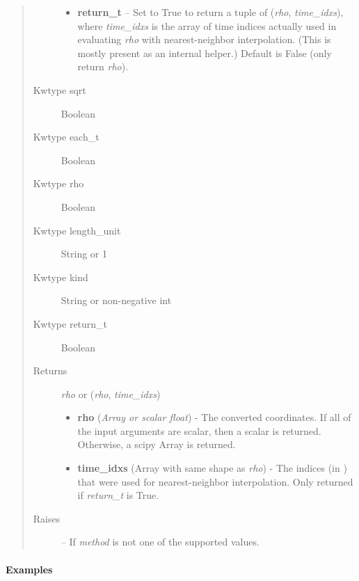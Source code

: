 \documentclass[letterpaper,10pt,english]{sphinxmanual}
\begin{document}
\begin{fulllineitems}
\begin{fulllineitems}
\begin{quote}
\begin{description}
\begin{itemize}
\item {} 
\textbf{return\_t} -- Set to True to return a tuple of (\emph{rho},
\emph{time\_idxs}), where \emph{time\_idxs} is the array of time indices
actually used in evaluating \emph{rho} with nearest-neighbor
interpolation. (This is mostly present as an internal helper.)
Default is False (only return \emph{rho}).

\end{itemize}

\item[{Kwtype sqrt}] \leavevmode
Boolean

\item[{Kwtype each\_t}] \leavevmode
Boolean

\item[{Kwtype rho}] \leavevmode
Boolean

\item[{Kwtype length\_unit}] \leavevmode
String or 1

\item[{Kwtype kind}] \leavevmode
String or non-negative int

\item[{Kwtype return\_t}] \leavevmode
Boolean

\item[{Returns}] \leavevmode

\emph{rho} or (\emph{rho}, \emph{time\_idxs})
\begin{itemize}
\item {} 
\textbf{rho} (\emph{Array or scalar float}) - The converted coordinates. If
all of the input arguments are scalar, then a scalar is returned.
Otherwise, a scipy Array is returned.

\item {} 
\textbf{time\_idxs} (Array with same shape as \emph{rho}) - The indices
(in ) that were used for
nearest-neighbor interpolation. Only returned if \emph{return\_t} is
True.

\end{itemize}


\item[{Raises}] \leavevmode
{} -- If \emph{method} is not one of the supported values.

\end{description}\end{quote}
\paragraph{Examples}


\end{fulllineitems}
\end{fulllineitems}
\end{document}
